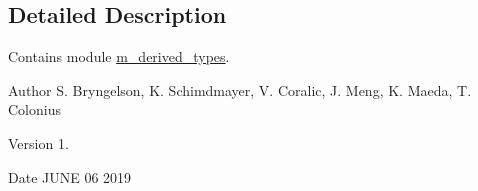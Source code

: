 \subsection{Detailed Description}
Contains module \hyperlink{namespacem__derived__types}{m\+\_\+derived\+\_\+types}. 

\begin{DoxyAuthor}{Author}
S. Bryngelson, K. Schimdmayer, V. Coralic, J. Meng, K. Maeda, T. Colonius 
\end{DoxyAuthor}
\begin{DoxyVersion}{Version}
1. 
\end{DoxyVersion}
\begin{DoxyDate}{Date}
J\+U\+NE 06 2019 
\end{DoxyDate}
